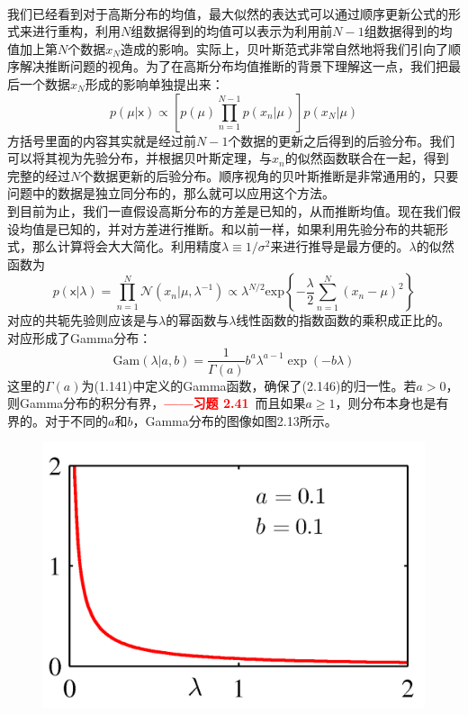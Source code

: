 \documentclass[b5paper]{book}
\numberwithin{equation}{chapter}
\newcommand {\sfx} {\boldsymbol{\mathsf{x}}}
\begin{document}
{\begin{figure}[ht]
		\label{fig:2-12}
	\end{figure}
	\\
	\indent 我们已经看到对于高斯分布的均值，最大似然的表达式可以通过顺序更新公式的形式来进行重构，利用$N$组数据得到的均值可以表示为利用前$N-1$组数据得到的均值加上第$N$个数据$x_N$造成的影响。实际上，贝叶斯范式非常自然地将我们引向了顺序解决推断问题的视角。为了在高斯分布均值推断的背景下理解这一点，我们把最后一个数据$x_N$形成的影响单独提出来：
	\begin{equation}
		p(\mu|\sfx)\propto \left[p(\mu)\prod_{n=1}^{N-1}p(x_n|\mu)\right]p(x_N|\mu)
	\end{equation}
	方括号里面的内容其实就是经过前$N-1$个数据的更新之后得到的后验分布。我们可以将其视为先验分布，并根据贝叶斯定理，与$x_n$的似然函数联合在一起，得到完整的经过$N$个数据更新的后验分布。顺序视角的贝叶斯推断是非常通用的，只要问题中的数据是独立同分布的，那么就可以应用这个方法。\\
	\indent 到目前为止，我们一直假设高斯分布的方差是已知的，从而推断均值。现在我们假设均值是已知的，并对方差进行推断。和以前一样，如果利用先验分布的共轭形式，那么计算将会大大简化。利用精度$\lambda\equiv1/\sigma^2$来进行推导是最方便的。$\lambda$的似然函数为
	\begin{equation}
		p(\sfx|\lambda)=\prod_{n=1}^N \mathcal{N}(x_n|\mu,\lambda^{-1})\propto\lambda^{N/2}\mathrm{exp}\left\{-\frac{\lambda}{2}\sum_{n=1}^N(x_n-\mu)^2\right\}
	\end{equation}
	对应的共轭先验则应该是与$\lambda$的幂函数与$\lambda$线性函数的指数函数的乘积成正比的。对应形成了Gamma分布：
	\begin{equation}
		\mathrm{Gam}(\lambda|a,b)=\frac{1}{\Gamma(a)}b^a\lambda^{a-1}\exp(-b\lambda)
	\end{equation}
	这里的$\Gamma(a)$为(1.141)中定义的Gamma函数，确保了(2.146)的归一性。若$a>0$，则Gamma分布的积分有界，\textcolor{red}{\textbf{——习题 2.41}}\ 而且如果$a \geqslant 1$，则分布本身也是有界的。对于不同的$a$和$b$，Gamma分布的图像如图2.13所示。
	\begin{figure}[ht]
	\centering
		\begin{minipage}[t]{0.3\linewidth}
		\centering
		\includegraphics[scale=0.8]{Images/2-13a.png}

\end{minipage}
\end{figure}}
\end{document}
